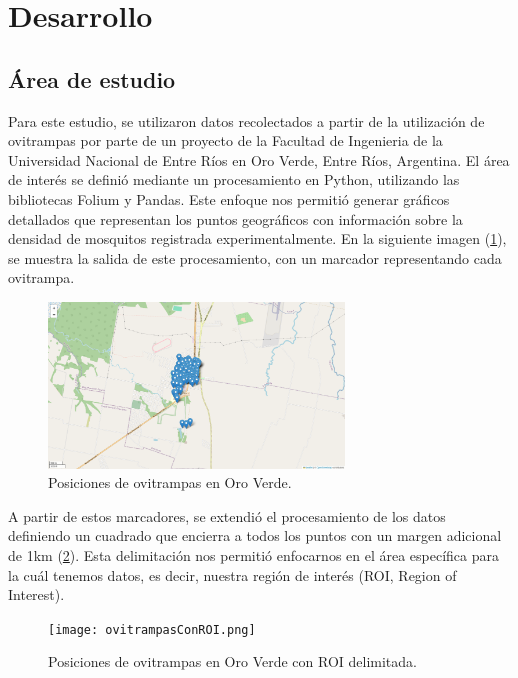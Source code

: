 

\section{Desarrollo}

\subsection{Área de estudio}

Para este estudio, se utilizaron datos recolectados a partir de la utilización de ovitrampas por parte de un proyecto de la Facultad de Ingenieria de la Universidad Nacional de Entre Ríos en Oro Verde, Entre Ríos, Argentina. El área de interés se definió mediante un procesamiento en Python, utilizando las bibliotecas Folium y Pandas. Este enfoque nos permitió generar gráficos detallados que representan los puntos geográficos con información sobre la densidad de mosquitos registrada experimentalmente. En la siguiente imagen (\figurename \ref{fig:ovitrampas}), se muestra la salida de este procesamiento, con un marcador representando cada ovitrampa.
	
\begin{figure}[H]
	\includegraphics[width=0.7\textwidth]{ovitrampas.png}
	\centering
	\caption{Posiciones de ovitrampas en Oro Verde.}
	\label{fig:ovitrampas}
	
\end{figure}

A partir de estos marcadores, se extendió el procesamiento de los datos definiendo un cuadrado que encierra a todos los puntos con un margen adicional de 1km (\figurename \ref{fig:ovitrampas-ROI}). Esta delimitación nos permitió enfocarnos en el área específica para la cuál tenemos datos, es decir, nuestra región de interés (ROI, Region of Interest).

\begin{figure}[H]
	\texttt{[image: ovitrampasConROI.png]}
	\centering
	\caption{Posiciones de ovitrampas en Oro Verde con ROI delimitada.}
	\label{fig:ovitrampas-ROI}
	
\end{figure}


